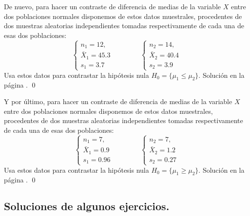 \documentclass[10pt,a4paper]{article}\usepackage[]{graphicx}\usepackage[]{color}
\newcounter {cont01}
\begin{document}
{\begin{ejercicio}
\label{tut09:ejercicio08}




De nuevo, para hacer un contraste de diferencia de medias de la variable $X$ entre dos poblaciones normales disponemos de estos datos muestrales, procedentes de dos muestras aleatorias independientes tomadas respectivamente de cada una de esas dos poblaciones:
\[
\begin{cases}
n_1 = 12,\\
{\bar X}_1 = 45.3\\
s_1 = 3.7
\end{cases}
\qquad\qquad
\begin{cases}
n_2 = 14,\\
{\bar X}_2 = 40.4\\
s_2 = 3.9
\end{cases}
\]
Usa estos datos para contrastar la hipótesis nula $H_0=\{\mu_1 \leq \mu_2 \}$.
Solución en la página \pageref{tut09:ejercicio08:sol}.
\qed
\end{ejercicio}


\begin{ejercicio}
\label{tut09:ejercicio09}




Y por último, para hacer un contraste de diferencia de medias de la variable $X$ entre dos poblaciones normales disponemos de estos datos muestrales, procedentes de dos muestras aleatorias independientes tomadas respectivamente de cada una de esas dos poblaciones:
\[
\begin{cases}
n_1 = 7,\\
{\bar X}_1 = 0.9\\
s_1 = 0.96
\end{cases}
\qquad\qquad
\begin{cases}
n_2 = 7,\\
{\bar X}_2 = 1.2\\
s_2 = 0.27
\end{cases}
\]
Usa estos datos para contrastar la hipótesis nula $H_0=\{\mu_1 \geq \mu_2 \}$.
Solución en la página \pageref{tut09:ejercicio09:sol}.
\qed
\end{ejercicio}



\subsection*{Soluciones de algunos ejercicios.}
\label{tut09:subsec:SolucionesAlgunosEjercicios}


}
\end{document}
